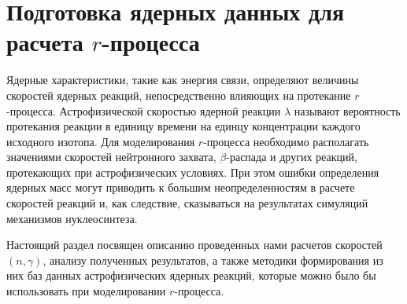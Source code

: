 \section{Подготовка ядерных данных для расчета $r$-процесса} 
Ядерные характеристики, такие как энергия связи, определяют величины скоростей ядерных реакций, непосредственно влияющих на протекание $r$-процесса. Астрофизической скоростью ядерной реакции $\lambda$ называют вероятность протекания реакции в единицу времени на единцу концентрации каждого исходного изотопа. Для моделирования $r$-процесса необходимо располагать значениями скоростей нейтронного захвата, $\beta$-распада и других реакций, протекающих при астрофизических условиях. При этом ошибки определения ядерных масс могут приводить к большим неопределенностям в расчете скоростей реакций и, как следствие, сказываться на результатах симуляций механизмов нуклеосинтеза.

Настоящий раздел посвящен описанию проведенных нами расчетов скоростей $(n,\gamma)$, анализу полученных результатов, а также методики формирования из них баз данных астрофизических ядерных реакций, которые можно было бы использовать при моделировании $r$-процесса.




